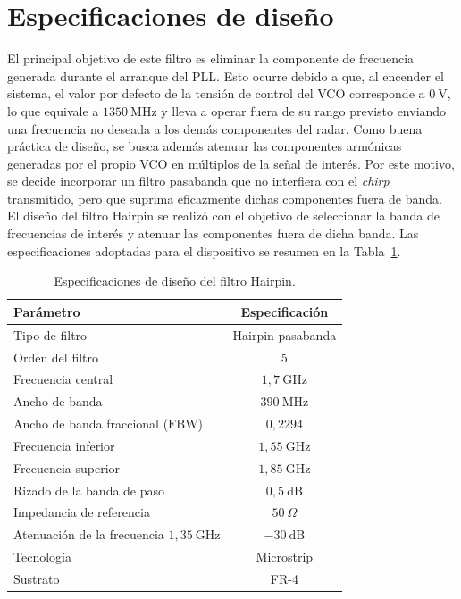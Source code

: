 \section{Especificaciones de diseño}

El principal objetivo de este filtro es eliminar la componente de frecuencia generada durante el arranque del PLL. Esto ocurre debido a que, al encender el sistema, el valor por defecto de la tensión de control del VCO corresponde a $0~\mathrm{V}$, lo que equivale a $1350~\mathrm{MHz}$ y lleva a operar fuera de su rango previsto enviando una frecuencia no deseada a los demás componentes del radar. Como buena práctica de diseño, se busca además atenuar las componentes armónicas generadas por el propio VCO en múltiplos de la señal de interés. Por este motivo, se decide incorporar un filtro pasabanda que no interfiera con el \textit{chirp} transmitido, pero que suprima eficazmente dichas componentes fuera de banda. El diseño del filtro Hairpin se realizó con el objetivo de seleccionar la banda de frecuencias de interés y atenuar las componentes fuera de dicha banda. Las especificaciones adoptadas para el dispositivo se resumen en la Tabla~\ref{tab:especificaciones_hairpin_dev}.

\begin{table}[H]
\centering
\begin{tabular}{lc}
\hline
\textbf{Parámetro} & \textbf{Especificación} \\
\hline
Tipo de filtro & Hairpin pasabanda \\
Orden del filtro & 5 \\
Frecuencia central & $1{,}7~\mathrm{GHz}$ \\
Ancho de banda & $390~\mathrm{MHz}$ \\
Ancho de banda fraccional ($\mathrm{FBW}$) & $0{,}2294$ \\
Frecuencia inferior & $1{,}55~\mathrm{GHz}$ \\
Frecuencia superior & $1{,}85~\mathrm{GHz}$ \\
Rizado de la banda de paso & $0{,}5~\mathrm{dB}$ \\
Impedancia de referencia & $50~\Omega$ \\
Atenuación de la frecuencia $1{,}35~\mathrm{GHz}$ & $-30~\mathrm{dB}$ \\
Tecnología & Microstrip \\
Sustrato & FR-4 \\
\hline
\end{tabular}
\caption{Especificaciones de diseño del filtro Hairpin.}
\label{tab:especificaciones_hairpin_dev}
\end{table}

